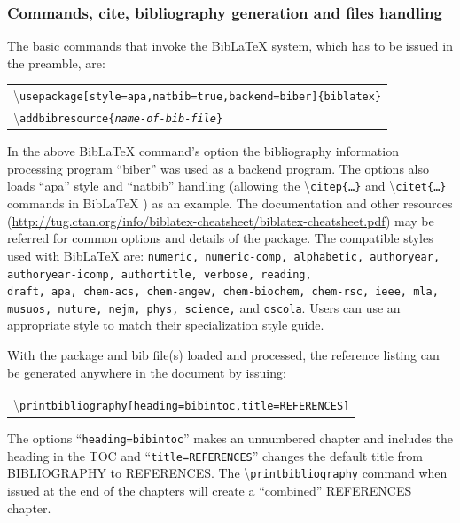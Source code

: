 \documentclass{article}
\newcommand\cmd[1]{\textbackslash\texttt{#1}}
\newcommand\ixm[2]{#2\index{#1!#2}} %
\newcommand\ccmd[1]{ %
\begin{center}
\begin{tabular}{l}
#1
\end{tabular}
\end{center}
}
\begin{document}
\subsubsection{Commands, cite, bibliography generation and files handling}

The basic commands that invoke the Bib\LaTeX\/ system, which has to be issued in the preamble, are:
\ccmd{
\cmd{usepackage[style=apa,natbib=true,backend=biber]\{biblatex\}}\\
\cmd{\ixm{Bib\LaTeX\ }{addbibresource}\{\textit{name-of-bib-file}\}}
}

In the above Bib\LaTeX\/ command's option the bibliography information processing program ``biber'' was used as a backend program. The options also loads ``apa'' style and ``natbib'' handling (allowing the \cmd{citep\{\ldots\}} and \cmd{citet\{\ldots\}} commands in  Bib\LaTeX\/ ) as an example. The documentation and other resources (\url{http://tug.ctan.org/info/biblatex-cheatsheet/biblatex-cheatsheet.pdf}) may be referred for common \ixm{Bib\LaTeX\ }{options} and details of the package. The compatible styles used with Bib\LaTeX\/ are: \texttt{numeric, numeric-comp, alphabetic, authoryear, authoryear-icomp, authortitle, verbose, reading, \\draft, apa, chem-acs, chem-angew, chem-biochem, chem-rsc, ieee, mla, musuos, nuture, nejm, phys, science,} and \texttt{oscola}. Users can use an appropriate style to match their specialization style guide.

With the package and bib file(s) loaded and processed, the reference listing can be generated anywhere in the document by issuing:
\ccmd{
\cmd{\ixm{Bib\LaTeX\ }{printbibliography}[heading=bibintoc,title=REFERENCES]}
}

The options ``\texttt{heading=bibintoc}'' makes an unnumbered chapter and includes the heading in the TOC and ``\texttt{title=REFERENCES}'' changes the default title from BIBLIOGRAPHY to REFERENCES. The \cmd{printbibliography} command when issued at the end of the chapters will create a ``combined'' REFERENCES chapter. 

\end{document}
